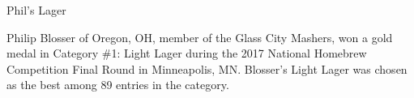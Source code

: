 \begin{recipie}{Phil's Lager}

\begin{aboutblock}
Philip Blosser of Oregon, OH, member of the Glass City Mashers, won a gold medal
in Category \#1: Light Lager during the 2017 National Homebrew Competition Final
Round in Minneapolis, MN. Blosser's Light Lager was chosen as the best among 89
entries in the category. \sourceaha
\end{aboutblock}


\begin{methodandtiming}
  
\begin{mashsteps}
\end{mashsteps}

\begin{fermentationsteps}
\end{fermentationsteps}

\end{methodandtiming}

\pagebreak

\begin{ingredientsblock}

\begin{malts}
\end{malts}

\begin{hops}
\end{hops}


\end{ingredientsblock}

\end{recipie}